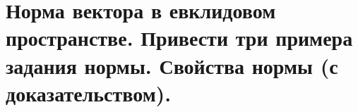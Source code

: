 \section{
    Норма вектора в евклидовом пространстве. Привести три примера задания нормы. Свойства нормы (с доказательством).
}

